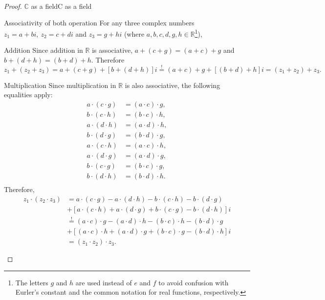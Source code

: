 \begin{proof}{$\bm{\mathbb{C}}$ as a field}{C as a field}
\begin{descitemize}
		\item[Associativity of both operation] For any three complex numbers $z_{1}=a+bi,\ z_{2}=c+di$ and $z_{3}=g+hi$ (where $a,b,c,d,g,h\in\mathbb{R}$\footnote{The letters $g$ and $h$ are used instead of $e$ and $f$ to avoid confusion with Eurler's constant and the common notation for real functions, respectively.}),
			\begin{listitemize}
			\item[Addition] Since addition in $\mathbb{R}$ is associative, $a+(c+g)=(a+c)+g$ and $b+(d+h)=(b+d)+h$. Therefore
				\[
					z_{1} + (z_{2}+z_{3}) = a+(c+g) + [b+(d+h)]i \overset{!}{=} (a+c)+g + [(b+d)+h]i = (z_{1}+z_{2}) + z_{3}.
				\]
			\item[Multiplication] Since multiplication in $\mathbb{R}$ is also associative, the following equalities apply:
				\begin{align*}
					a\cdot(c\cdot g) &= (a\cdot c)\cdot g,\\
					b\cdot(c\cdot h) &= (b\cdot c)\cdot h,\\
					a\cdot(d\cdot h) &= (a\cdot d)\cdot h,\\
					b\cdot(d\cdot g) &= (b\cdot d)\cdot g,\\
					a\cdot(c\cdot h) &= (a\cdot c)\cdot h,\\
					a\cdot(d\cdot g) &= (a\cdot d)\cdot g,\\
					b\cdot(c\cdot g) &= (b\cdot c)\cdot g,\\
					b\cdot(d\cdot h) &= (b\cdot d)\cdot h.\\
				\end{align*}
				Therefore,
				\begin{align*}
					z_{1}\cdot(z_{2} \cdot z_{3}) &= a\cdot(c\cdot g) - a\cdot(d\cdot h) - b\cdot(c\cdot h) - b\cdot(d\cdot g)\\ &+[a\cdot(c\cdot h) + a\cdot(d\cdot g) + b\cdot(c\cdot g) - b\cdot(d\cdot h)]i\\
					&\overset{!}{=} (a\cdot c)\cdot g - (a\cdot d)\cdot h - (b\cdot c)\cdot h - (b\cdot d)\cdot g\\ &+[(a\cdot c)\cdot h + (a\cdot d)\cdot g + (b\cdot c)\cdot g - (b\cdot d)\cdot h]i\\
					&= (z_{1} \cdot z_{2}) \cdot z_{3}.
				\end{align*}
			\end{listitemize}


\end{descitemize}
\end{proof}

